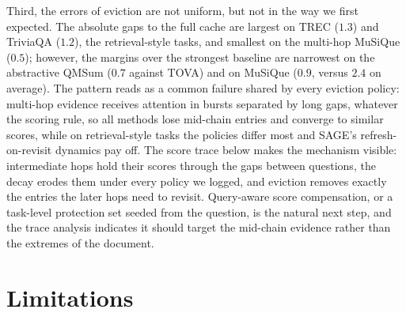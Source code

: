 Third, the errors of eviction are not uniform, but not in the way we
first expected. The absolute gaps to the full cache are largest on
TREC ($1.3$) and TriviaQA ($1.2$), the retrieval-style tasks, and
smallest on the multi-hop MuSiQue ($0.5$); however, the margins over
the strongest baseline are narrowest on the abstractive QMSum ($0.7$
against TOVA) and on MuSiQue ($0.9$, versus $2.4$ on average). The pattern reads as a common failure
shared by every eviction policy: multi-hop evidence receives attention
in bursts separated by long gaps, whatever the scoring rule, so all
methods lose mid-chain entries and converge to similar scores, while
on retrieval-style tasks the policies differ most and SAGE's
refresh-on-revisit dynamics pay off. The score trace below makes the
mechanism visible: intermediate hops hold their scores through the
gaps between questions, the decay erodes them under every policy we
logged, and eviction removes exactly the entries the later hops need
to revisit. Query-aware score compensation, or a task-level protection
set seeded from the question, is the natural next step, and the trace
analysis indicates it should target the mid-chain evidence rather
than the extremes of the document.

\section{Limitations}\label{sec:limitations}

